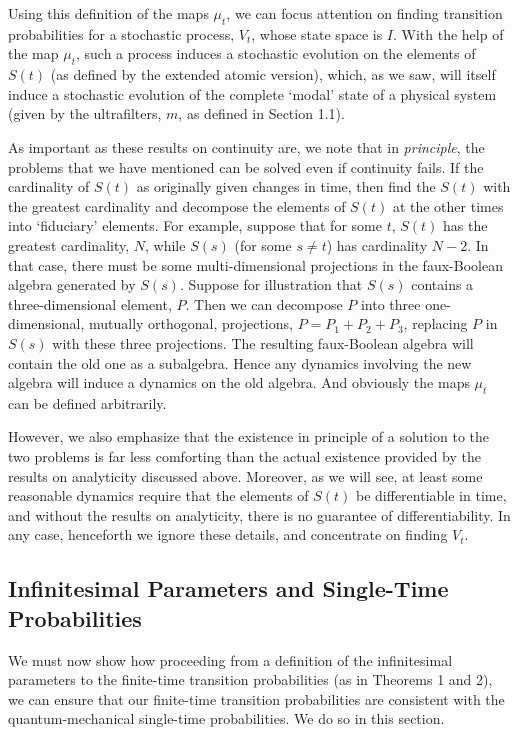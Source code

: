 \documentclass[12pt]{article}
\begin{document}
Using this definition of the maps $\mu_{t}$, we can focus attention on
finding transition probabilities for a stochastic process, $V_{t}$,
whose state space is $I$.  With the help of the map $\mu_{t}$, such a
process induces a stochastic evolution on the elements of $S(t)$ (as
defined by the extended atomic version), which, as we saw, will itself
induce a stochastic evolution of the complete `modal' state of a
physical system (given by the ultrafilters, $m$, as defined in Section
1.1).

As important as these results on continuity are, we note that in {\it
principle}, the problems that we have mentioned can be solved even if
continuity fails.  If the cardinality of $S(t)$ as originally given
changes in time, then find the $S(t)$ with the greatest cardinality
and decompose the elements of $S(t)$ at the other times into
`fiduciary' elements.  For example, suppose that for some $t$, $S(t)$
has the greatest cardinality, $N$, while $S(s)$ (for some $s \neq t$)
has cardinality $N-2$.  In that case, there must be some
multi-dimensional projections in the faux-Boolean algebra generated by
$S(s)$.  Suppose for illustration that $S(s)$ contains a
three-dimensional element, $P$.  Then we can decompose $P$ into three
one-dimensional, mutually orthogonal, projections, $P = P_{1} + P_{2}
+ P_{3}$, replacing $P$ in $S(s)$ with these three projections.  The
resulting faux-Boolean algebra will contain the old one as a
subalgebra.  Hence any dynamics involving the new algebra will induce
a dynamics on the old algebra.  And obviously the maps $\mu_{t}$ can
be defined arbitrarily.

However, we also emphasize that the existence in principle of a
solution to the two problems is far less comforting than the actual
existence provided by the results on analyticity discussed above.
Moreover, as we will see, at least some reasonable dynamics require
that the elements of $S(t)$ be differentiable in time, and without the
results on analyticity, there is no guarantee of differentiability.
In any case, henceforth we ignore these details, and concentrate on
finding $V_{t}$.


\subsection{Infinitesimal Parameters and Single-Time Probabilities}


We must now show how proceeding from a definition of the infinitesimal 
parameters to the finite-time transition probabilities (as in Theorems 
1 and 2), we can ensure that our finite-time transition probabilities 
are consistent with the quantum-mechanical single-time probabilities.  
We do so in this section.
\end{document}
